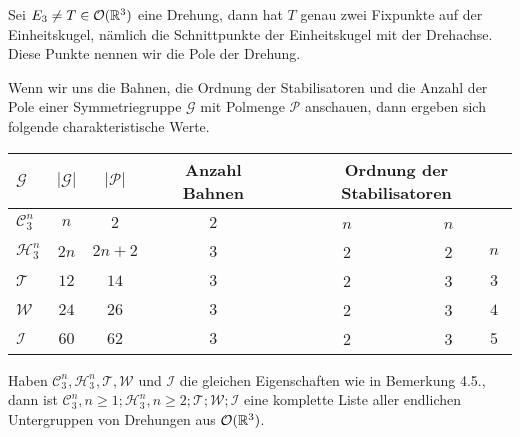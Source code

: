 \begin{defi}
 Sei $E_3 \neq T \in {\mathcal{O}(\mathbb{R}^3)}$ eine Drehung, dann hat $T$ genau zwei Fixpunkte auf der Einheitskugel, nämlich die Schnittpunkte der Einheitskugel mit der Drehachse. Diese Punkte nennen wir die Pole der Drehung.
\end{defi}
\begin{bem}
 Wenn wir uns die Bahnen, die Ordnung der Stabilisatoren und die Anzahl der Pole einer Symmetriegruppe $\mathcal{G}$ mit Polmenge $\mathcal{P}$ anschauen, dann ergeben sich folgende charakteristische Werte.
 {%
\begin{center}
\begin{tabular}{l|cccccc}
$\mathcal{G}$ & $|\mathcal{G}|$ & $|\mathcal{P}|$ & Anzahl Bahnen & \multicolumn{3}{c}{Ordnung der Stabilisatoren}\\
\hline
$\mathcal{C}^n_3$ & $n$ & $2$ & $2$ & \ \ \ \ \ $n$ & \ \ \ \ \ \ $n$ & \\
$\mathcal{H}^n_3$ & $2n$ & $2n + 2$ & $3$ & \ \ \ \ \ $2$ & \ \ \ \ \ \ $2$ & $n$\\
$\mathcal{T}$ & $12$ & $14$ & $3$ & \ \ \ \ \ $2$ & \ \ \ \ \ \ $3$ & $3$\\
$\mathcal{W}$ & $24$ & $26$ & $3$ & \ \ \ \ \  $2$ & \ \ \ \ \ \ $3$ & $4$\\
$\mathcal{I}$ & $60$ & $62$ & $3$ & \ \ \ \ \ $2$ & \ \ \ \ \ \ $3$ & $5$
 \end{tabular}
 \end{center}
}%
\end{bem}
\begin{theorem}
 Haben $\mathcal{C}^n_3,\mathcal{H}^n_3,\mathcal{T},\mathcal{W}$ und $\mathcal{I}$ die gleichen Eigenschaften wie in Bemerkung 4.5., dann ist $\mathcal{C}^n_3,n\geq1;\mathcal{H}^n_3,n\geq2;\mathcal{T};\mathcal{W};\mathcal{I}$ eine komplette Liste aller endlichen Untergruppen von Drehungen aus ${\mathcal{O}(\mathbb{R}^3)}$.
\end{theorem}



